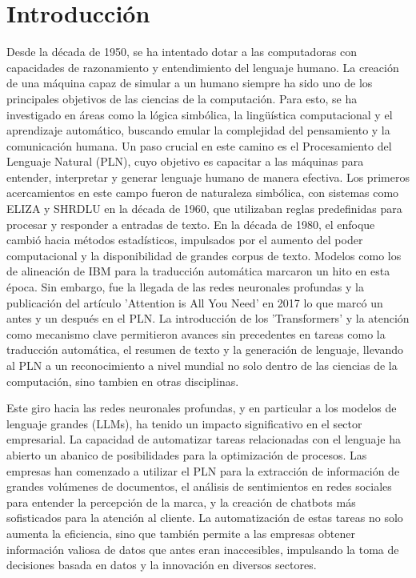 \chapter*{Introducción}\label{chapter:introduction}

Desde la década de 1950, se ha intentado dotar a las computadoras con capacidades de razonamiento y entendimiento del lenguaje humano. La creación de una máquina capaz de simular a un humano siempre ha sido uno de los principales objetivos de las ciencias de la computación. Para esto, se ha investigado en áreas como la lógica simbólica, la lingüística computacional y el aprendizaje automático, buscando emular la complejidad del pensamiento y la comunicación humana. Un paso crucial en este camino es el Procesamiento del Lenguaje Natural (PLN), cuyo objetivo es capacitar a las máquinas para entender, interpretar y generar lenguaje humano de manera efectiva. Los primeros acercamientos en este campo fueron de naturaleza simbólica, con sistemas como ELIZA y SHRDLU en la década de 1960, que utilizaban reglas predefinidas para procesar y responder a entradas de texto. En la década de 1980, el enfoque cambió hacia métodos estadísticos, impulsados por el aumento del poder computacional y la disponibilidad de grandes corpus de texto. Modelos como los de alineación de IBM para la traducción automática marcaron un hito en esta época. Sin embargo, fue la llegada de las redes neuronales profundas y la publicación del artículo 'Attention is All You Need' en 2017 lo que marcó un antes y un después en el PLN. La introducción de los 'Transformers' y la atención como mecanismo clave permitieron avances sin precedentes en tareas como la traducción automática, el resumen de texto y la generación de lenguaje, llevando al PLN a un reconocimiento a nivel mundial no solo dentro de las ciencias de la computación, sino tambien en otras disciplinas.

Este giro hacia las redes neuronales profundas, y en particular a los modelos de lenguaje grandes (LLMs), ha tenido un impacto significativo en el sector empresarial. La capacidad de automatizar tareas relacionadas con el lenguaje ha abierto un abanico de posibilidades para la optimización de procesos. Las empresas han comenzado a utilizar el PLN para la extracción de información de grandes volúmenes de documentos, el análisis de sentimientos en redes sociales para entender la percepción de la marca, y la creación de chatbots más sofisticados para la atención al cliente. La automatización de estas tareas no solo aumenta la eficiencia, sino que también permite a las empresas obtener información valiosa de datos que antes eran inaccesibles, impulsando la toma de decisiones basada en datos y la innovación en diversos sectores.

